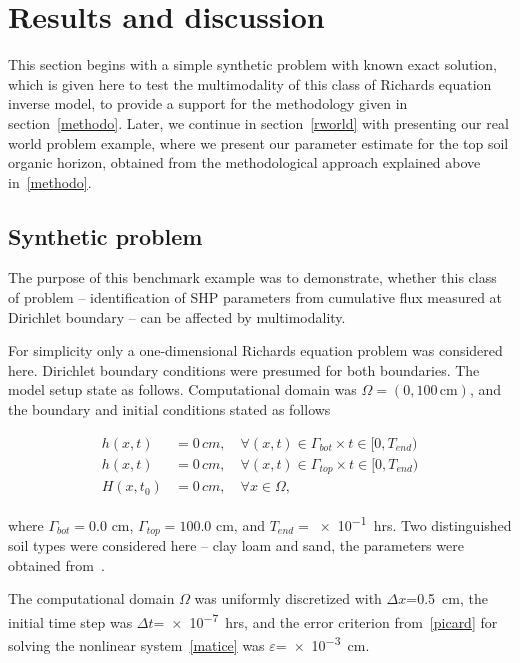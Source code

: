 \documentclass[review,times,3p,10pt]{elsarticle}
\newenvironment{lineq}
    {\begin{linenomath*}
    \begin{equation}
    }
    { 
    \end{equation} 
    \end{linenomath*}
    }
\begin{document}
 



\section{Results and discussion} 

This section begins with  a simple synthetic problem with known exact solution, which is given here to test the multimodality of this class of Richards equation inverse model, to provide a support for the methodology given in section~\ref{methodo}. Later,  we continue in section~\ref{rworld} with presenting our real world problem example, where we  present our parameter estimate for the top soil organic horizon, obtained from the methodological approach explained above in~\ref{methodo}.

\subsection{Synthetic problem}
 \label{benchmarks}
 
The purpose of this benchmark example was to demonstrate, whether this class of problem -- identification of SHP parameters from cumulative flux measured at Dirichlet boundary -- can be affected by multimodality.


 For simplicity only a one-dimensional Richards equation problem was considered here.  Dirichlet boundary conditions were presumed for both boundaries. The model setup state as follows. Computational domain was $\Omega=(0,100\,\mathrm{cm})$, and the boundary and initial conditions stated as follows
 \begin{lineq}
 \begin{split}
 h(x,t) &= 0\, cm, \quad \forall (x,t) \in \Gamma_{bot} \times  t \in [0, T_{end}) \\ 
  h(x,t) &= 0\, cm, \quad \forall (x,t) \in \Gamma_{top} \times  t \in [0, T_{end}) \\ 
  H(x,t_0) &= 0\, cm , \quad \forall x \in \Omega,
  \end{split}
\end{lineq}
 where $\Gamma_{bot}=0.0$ cm, $\Gamma_{top}=100.0$ cm, and $T_{end}=$\num{e-1}~hrs. Two distinguished soil types were considered here -- clay loam and sand, the parameters were obtained from~\citep{retc}.
 

 
  The computational domain $\Omega$ was uniformly discretized with $\Delta x$=0.5~cm, the initial time step was $\Delta t$=\num{e-7}~hrs, and the error criterion from~\eqref{picard} for solving the nonlinear system~\eqref{matice} was   $\varepsilon$=\num{e-3}~cm.
 
\end{document}
